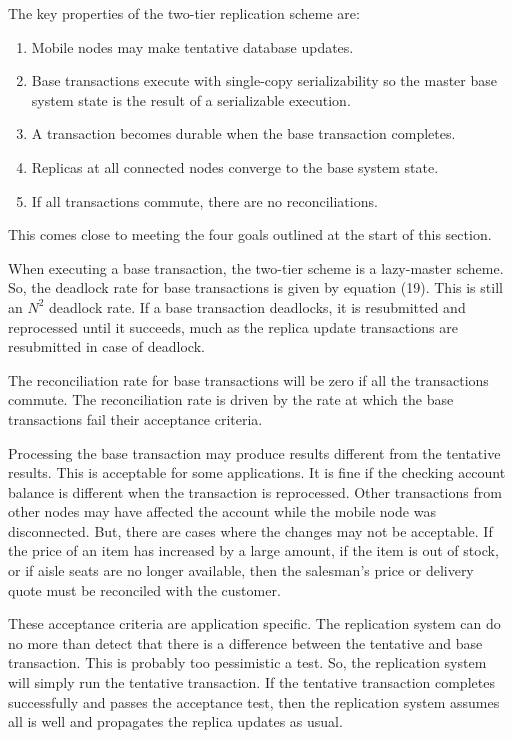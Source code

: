 \documentclass[a4paper,12pt,twoside,openright]{article}
\begin{document}
The key properties of the two-tier replication scheme are:

\begin{enumerate}
\def\labelenumi{\arabic{enumi}.}
\item
  Mobile nodes may make tentative database updates.
\item
  Base transactions execute with single-copy serializability so the
  master base system state is the result of a serializable execution.
\item
  A transaction becomes durable when the base transaction completes.
\item
  Replicas at all connected nodes converge to the base system state.
\item
  If all transactions commute, there are no reconciliations.
\end{enumerate}

This comes close to meeting the four goals outlined at the start of this
section.

When executing a base transaction, the two-tier scheme is a lazy-master
scheme. So, the deadlock rate for base transactions is given by equation
(19). This is still an \(N^2\) deadlock rate. If a
base transaction deadlocks, it is resubmitted and reprocessed until it
succeeds, much as the replica update transactions are resubmitted in
case of deadlock.

The reconciliation rate for base transactions will be zero if all the
transactions commute. The reconciliation rate is driven by the rate at
which the base transactions fail their acceptance criteria.

Processing the base transaction may produce results different from the
tentative results. This is acceptable for some applications. It is fine
if the checking account balance is different when the transaction is
reprocessed. Other transactions from other nodes may have affected the
account while the mobile node was disconnected. But, there are cases
where the changes may not be acceptable. If the price of an item has
increased by a large amount, if the item is out of stock, or if aisle
seats are no longer available, then the salesman's price or delivery
quote must be reconciled with the customer.

These acceptance criteria are application specific. The replication
system can do no more than detect that there is a difference between the
tentative and base transaction. This is probably too pessimistic a test.
So, the replication system will simply run the tentative transaction. If
the tentative transaction completes successfully and passes the
acceptance test, then the replication system assumes all is well and
propagates the replica updates as usual.
\end{document}

